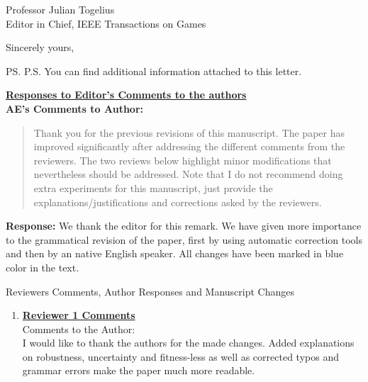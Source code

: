 \documentclass[10pt]{letter} %
\begin{document}
\begin{letter}{Professor Julian Togelius \\ Editor in Chief, IEEE Transactions on Games}
\vspace{2\parskip} %
\closing{Sincerely yours,}
\vspace{2\parskip} %

\ps{P.S. You can find additional information attached to this letter.} %


\newpage


{\bf \underline{ Responses to Editor's  Comments to the authors}}\\

	\bf  {\bf AE's Comments to Author:} 
				\begin{quote}	
Thank you for the previous revisions of this manuscript. The paper has improved significantly after addressing the different comments from the reviewers. The two reviews below highlight minor modifications that nevertheless should be addressed. Note that I do not recommend doing extra experiments for this manuscript, just provide the explanations/justifications and corrections asked by the reviewers.
				\end{quote}	
 {\bf Response:} 
We thank the editor for this remark. We have given more importance to the grammatical revision of the paper, first by using automatic correction tools and then by an native English speaker. All changes have been marked in blue color in the text.

\newpage
 Reviewers Comments, Author Responses and Manuscript Changes
\begin{enumerate}

\item {\bf \underline{ Reviewer 1 Comments}}\\
		Comments to the Author:\\
	I would like to thank the authors for the made changes. Added explanations on robustness, uncertainty and fitness-less as well as corrected typos and grammar errors make the paper much more readable.
	

\end{enumerate}
\end{letter}
\end{document}
